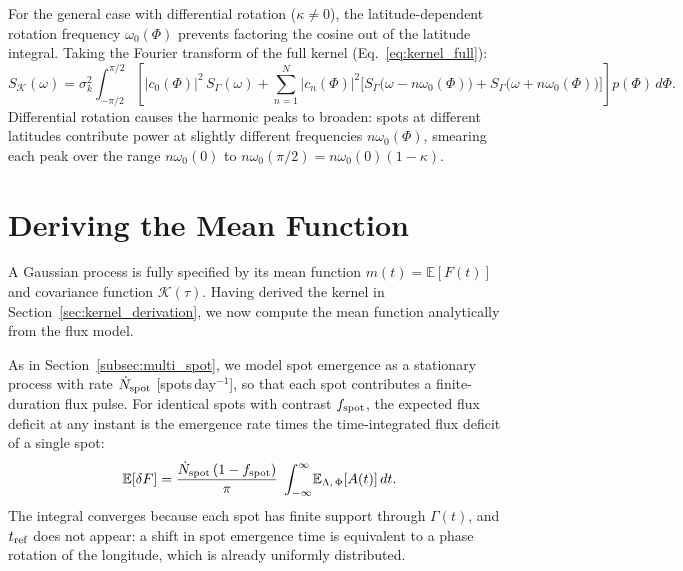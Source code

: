 \documentclass[preprint]{aastex702}
\newcommand{\E}{\mathbb{E}}
\begin{document}
For the general case with differential rotation ($\kappa \neq 0$), the latitude-dependent rotation frequency $\omega_0(\Phi)$ prevents factoring the cosine out of the latitude integral. Taking the Fourier transform of the full kernel (Eq.~\ref{eq:kernel_full}):
\begin{equation}
\boxed{
    S_{\mathcal{K}}(\omega) = \sigma_k^2 \int_{-\pi/2}^{\pi/2}
    \left[
        |c_0(\Phi)|^2\, S_\Gamma(\omega)
        + \sum_{n=1}^{N} |c_n(\Phi)|^2 \Big[S_\Gamma\!\big(\omega - n\omega_0(\Phi)\big) + S_\Gamma\!\big(\omega + n\omega_0(\Phi)\big)\Big]
    \right] p(\Phi)\, d\Phi.
}
    \label{eq:psd_full}
\end{equation}
Differential rotation causes the harmonic peaks to broaden: spots at different latitudes contribute power at slightly different frequencies $n\omega_0(\Phi)$, smearing each peak over the range $n\omega_0(0)$ to $n\omega_0(\pi/2) = n\omega_0(0)(1 - \kappa)$.

\vspace{\baselineskip}
\section{Deriving the Mean Function} \label{sec:mean_function}

A Gaussian process is fully specified by its mean function $m(t) = \E[F(t)]$ and covariance function $\mathcal{K}(\tau)$. Having derived the kernel in Section~\ref{sec:kernel_derivation}, we now compute the mean function analytically from the flux model.

As in Section~\ref{subsec:multi_spot}, we model spot emergence as a stationary process with rate $\dot{N}_{\rm spot}$ [spots\,day$^{-1}$], so that each spot contributes a finite-duration flux pulse. For identical spots with contrast $f_{\rm spot}$, the expected flux deficit at any instant is the emergence rate times the time-integrated flux deficit of a single spot:
\begin{equation}
    \E[\delta F] = \frac{\dot{N}_{\rm spot}\,(1 - f_{\rm spot})}{\pi}\;\int_{-\infty}^{\infty}\! \E_{\Lambda,\,\Phi}[A(t)]\,dt.
    \label{eq:mean_deficit}
\end{equation}
The integral converges because each spot has finite support through $\Gamma(t)$, and $t_{\rm ref}$ does not appear: a shift in spot emergence time is equivalent to a phase rotation of the longitude, which is already uniformly distributed.
\end{document}
